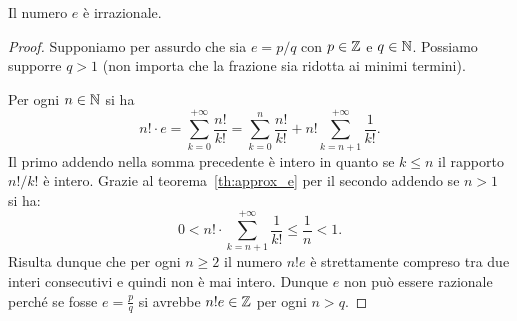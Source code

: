 \begin{theorem}[irrazionalità di $e$]
%
%
\mymark{**}%
%
%
Il numero $e$ è irrazionale.
\end{theorem}
%
\begin{proof}
Supponiamo per assurdo che sia $e=p/q$ con $p\in {\mathbb Z}$ e $q \in {\mathbb N}$.
Possiamo supporre $q>1$
(non importa che la frazione sia ridotta ai minimi termini).

Per ogni $n\in {\mathbb N}$ si ha 
\[
  n! \cdot e = \sum_{k=0}^{+\infty} \frac{n!}{k!}
   = \sum_{k=0}^n \frac{n!}{k!} + n!\sum_{k=n+1}^{+\infty} \frac{1}{k!}.
\]
Il primo addendo nella somma precedente è intero
in quanto se $k\le n$ il rapporto $n!/k!$ è intero.
Grazie al teorema~\ref{th:approx_e}
per il secondo addendo se $n>1$ si ha:
\[
0 < n! \cdot \sum_{k=n+1}^{+\infty} \frac{1}{k!}
\le \frac{1}{n} < 1.
\]
Risulta dunque che per ogni $n\ge 2$ il numero $n! e$
è strettamente compreso tra due interi consecutivi e quindi non 
è mai intero. Dunque $e$ non può essere razionale perché 
se fosse $e=\frac p q$ si avrebbe $n! e \in {\mathbb Z}$ per ogni 
$n>q$.
\end{proof}

